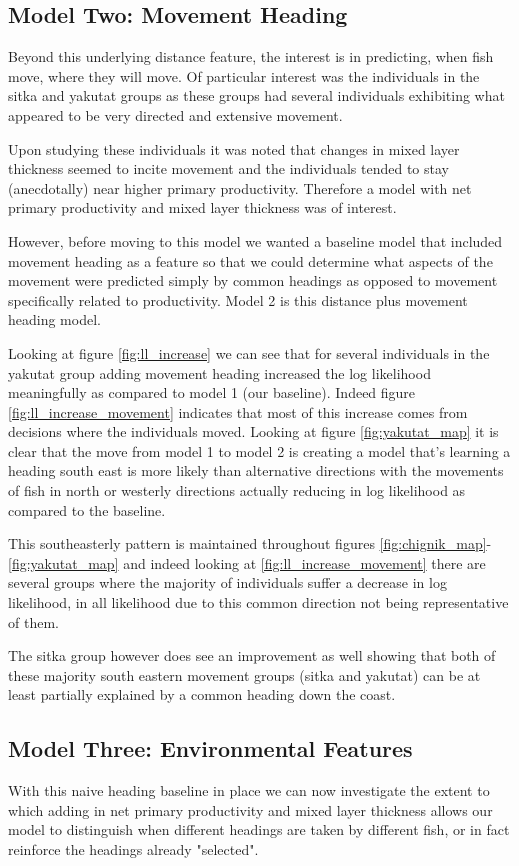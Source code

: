 \documentclass[11pt]{article}
\begin{document}
\subsection*{Model Two: Movement Heading}
Beyond this underlying distance feature, the interest is in predicting, when fish move, where they will move. Of particular interest was the individuals in the sitka and yakutat groups as these groups had several individuals exhibiting what appeared to be very directed and extensive movement. 

Upon studying these individuals it was noted that changes in mixed layer thickness seemed to incite movement and the individuals tended to stay (anecdotally) near higher primary productivity. Therefore a model with net primary productivity and mixed layer thickness was of interest. 

However, before moving to this model we wanted a baseline model that included movement heading as a feature so that we could determine what aspects of the movement were predicted simply by common headings as opposed to movement specifically related to productivity. Model 2 is this distance plus movement heading model. 

Looking at figure \ref{fig:ll_increase} we can see that for several individuals in the yakutat group adding movement heading increased the log likelihood meaningfully as compared to model 1 (our baseline). 
Indeed figure \ref{fig:ll_increase_movement} indicates that most of this increase comes from decisions where the individuals moved. Looking at figure \ref{fig:yakutat_map} it is clear that the move from model 1 to model 2 is creating a model that's learning a heading south east is more likely than alternative directions with the movements of fish in north or westerly directions actually reducing in log likelihood as compared to the baseline. 

This southeasterly pattern is maintained throughout figures \ref{fig:chignik_map}-\ref{fig:yakutat_map} and indeed looking at \ref{fig:ll_increase_movement} there are several groups where the majority of individuals suffer a decrease in log likelihood, in all likelihood due to this common direction not being representative of them.  

The sitka group however does see an improvement as well showing that both of these majority south eastern movement groups (sitka and yakutat) can be at least partially explained by a common heading down the coast. 

\subsection*{Model Three: Environmental Features}
With this naive heading baseline in place we can now investigate the extent to which adding in net primary productivity and mixed layer thickness allows our model to distinguish when different headings are taken by different fish, or in fact reinforce the headings already "selected". 
\end{document}

